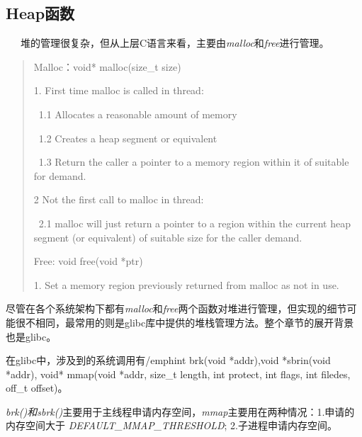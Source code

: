 \documentclass[12pt]{article}  %
\begin{document}
\subsection{Heap函数}
\ \ \ 堆的管理很复杂，但从上层C语言来看，主要由\emph{malloc}和\emph{free}进行管理。\par
\begin{quotation}
Malloc：void* malloc(size\_t size) \par
1. First time malloc is called in thread:\par
\ 1.1 Allocates a reasonable amount of memory\par
\ 1.2 Creates a heap segment or equivalent\par
\ 1.3 Return the caller a pointer to a memory region within it of suitable for demand.\par
2 Not the first call to malloc in thread:\par
\ 2.1 malloc will just return a pointer to a region within the current heap segment (or equivalent) of suitable size for the caller demand.\par \par \par

Free: void free(void *ptr)\par
1. Set a memory region previously returned from malloc as not in use.
\end{quotation}\par
尽管在各个系统架构下都有\emph{malloc}和\emph{free}两个函数对堆进行管理，但实现的细节可能很不相同，最常用的则是glibc库中提供的堆栈管理方法。整个章节的展开背景也是glibc。\par
在glibc中，涉及到的系统调用有/emph{int brk(void *addr),void *sbrin(void *addr), void* mmap(void *addr, size\_t length, int protect, int flags, int filedes, off\_t offset)}。\par
\emph{brk()和sbrk()}主要用于主线程申请内存空间，\emph{mmap}主要用在两种情况：1.申请的内存空间大于 \emph{DEFAULT\_MMAP\_THRESHOLD}; 2.子进程申请内存空间。
\end{document}
